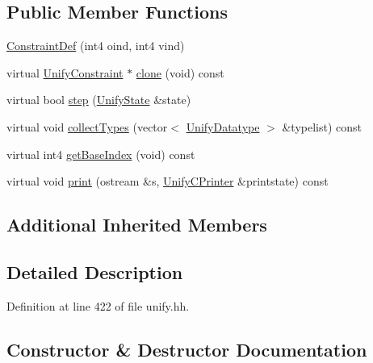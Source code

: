 \subsection*{Public Member Functions}
\begin{DoxyCompactItemize}
\item 
\mbox{\hyperlink{class_constraint_def_a25ccad5ea3493b2f17e03577a6075022}{Constraint\+Def}} (int4 oind, int4 vind)
\item 
virtual \mbox{\hyperlink{class_unify_constraint}{Unify\+Constraint}} $\ast$ \mbox{\hyperlink{class_constraint_def_aae85758fdf38d79bdd086955afa57cde}{clone}} (void) const
\item 
virtual bool \mbox{\hyperlink{class_constraint_def_acd26c5907c37a243b7edee01ce9b358d}{step}} (\mbox{\hyperlink{class_unify_state}{Unify\+State}} \&state)
\item 
virtual void \mbox{\hyperlink{class_constraint_def_aa0899ad894f7c0676371ef9a25effc55}{collect\+Types}} (vector$<$ \mbox{\hyperlink{class_unify_datatype}{Unify\+Datatype}} $>$ \&typelist) const
\item 
virtual int4 \mbox{\hyperlink{class_constraint_def_a2b5f27e4f0b872da4ffcfa56af4cbfaa}{get\+Base\+Index}} (void) const
\item 
virtual void \mbox{\hyperlink{class_constraint_def_a3ff02cb8d29bdc23b916558eaf174639}{print}} (ostream \&s, \mbox{\hyperlink{class_unify_c_printer}{Unify\+C\+Printer}} \&printstate) const
\end{DoxyCompactItemize}
\subsection*{Additional Inherited Members}


\subsection{Detailed Description}


Definition at line 422 of file unify.\+hh.



\subsection{Constructor \& Destructor Documentation}
\mbox{\label{class_constraint_def_a25ccad5ea3493b2f17e03577a6075022}} 
